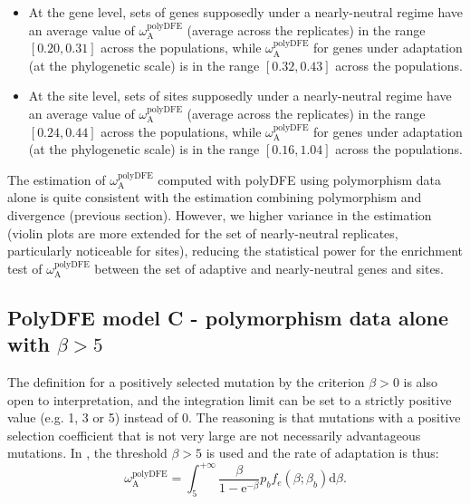 \documentclass{article}
\newcommand{\der}{\mathrm{d}}
\newcommand{\e}{\mathrm{e}}
\newcommand{\rateApop}{\omega_{\mathrm{A}}}
\newcommand{\Spop}{\beta}
\begin{document}
    \begin{itemize}
        \item At the gene level, sets of genes supposedly under a nearly-neutral regime have an average value of $\rateApop^{\mathrm{polyDFE}}$ (average across the replicates) in the range $[0.20,0.31]$ across the populations, while $\rateApop^{\mathrm{polyDFE}}$ for genes under adaptation (at the phylogenetic scale) is in the range $[0.32,0.43]$ across the populations.
        \item At the site level, sets of sites supposedly under a nearly-neutral regime have an average value of $\rateApop^{\mathrm{polyDFE}}$ (average across the replicates) in the range $[0.24,0.44]$ across the populations, while $\rateApop^{\mathrm{polyDFE}}$ for genes under adaptation (at the phylogenetic scale) is in the range $[0.16,1.04]$ across the populations.
    \end{itemize}

    The estimation of $\rateApop^{\mathrm{polyDFE}}$ computed with polyDFE using polymorphism data alone is quite consistent with the estimation combining polymorphism and divergence (previous section).
    However, we higher variance in the estimation (violin plots are more extended for the set of nearly-neutral replicates, particularly noticeable for sites), reducing the statistical power for the enrichment test of $\rateApop^{\mathrm{polyDFE}}$ between the set of adaptive and nearly-neutral genes and sites.

    \pagebreak

    \subsection{PolyDFE model C - polymorphism data alone with $\Spop > 5$}

    The definition for a positively selected mutation by the criterion $\Spop > 0$ is also open to interpretation, and the integration limit can be set to a strictly positive value (e.g. 1, 3 or 5) instead of 0\cite{galtier_adaptive_2016, tataru_inference_2017}.
    The reasoning is that mutations with a positive selection coefficient that is not very large are not necessarily advantageous mutations.
    In \textcite{galtier_adaptive_2016}, the threshold $\Spop > 5$ is used and the rate of adaptation is thus:
    \begin{equation}
        \rateApop^{\mathrm{polyDFE}} = \int_{5}^{+\infty} \frac{\Spop}{1 - \e^{-\Spop}} p_b f_{e}(\Spop; \Spop_b) \der \Spop.
    \end{equation}
    
\end{document}
